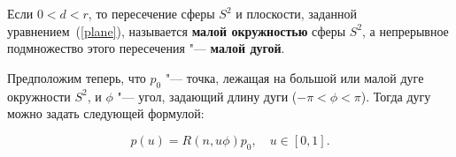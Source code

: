 \begin{definition}
Если $0<d<r$, то пересечение сферы $S^2$ и плоскости, заданной уравнением~(\ref{plane}), называется \textbf{малой
окружностью} сферы $S^2$, а непрерывное подмножество этого пересечения "--- \textbf{малой дугой}.
\end{definition}

Предположим теперь, что $p_0$ "--- точка, лежащая на большой или малой дуге окружности $S^2$, и $\phi$ "--- угол,
задающий длину дуги ($-\pi < \phi < \pi$). Тогда дугу можно задать следующей формулой:

$$
p(u)=R(n,u\phi)p_0, \quad u \in [0,1].
$$
